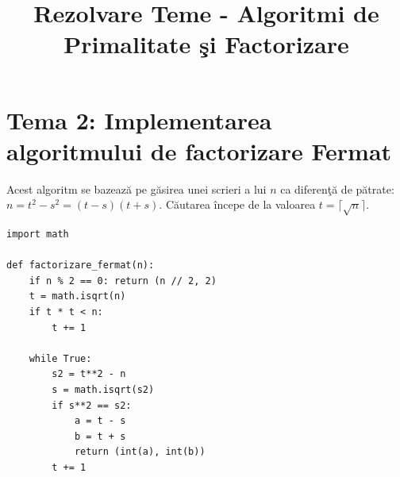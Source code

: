 \documentclass[12pt, a4paper]{article}
\title{Rezolvare Teme - Algoritmi de Primalitate \c{s}i Factorizare}
\author{}
\date{}
\begin{document}
\maketitle  

\section*{Tema 2: Implementarea algoritmului de factorizare Fermat}

Acest algoritm se bazeaz\u{a} pe g\u{a}sirea unei scrieri a lui $n$ ca diferen\c{t}\u{a} de p\u{a}trate: $n = t^2 - s^2 = (t-s)(t+s)$. C\u{a}utarea \^{i}ncepe de la valoarea $t = \lceil\sqrt{n}\rceil$.

\begin{lstlisting}
import math

def factorizare_fermat(n):
    if n % 2 == 0: return (n // 2, 2)
    t = math.isqrt(n)
    if t * t < n:
        t += 1
        
    while True:
        s2 = t**2 - n
        s = math.isqrt(s2)
        if s**2 == s2:
            a = t - s
            b = t + s
            return (int(a), int(b))
        t += 1
\end{lstlisting}
\end{document}
